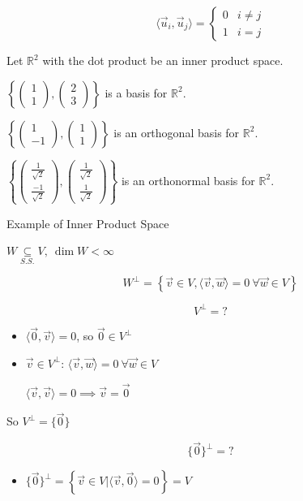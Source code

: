 \documentclass[11pt,fleqn]{book} %
\begin{document}
$$\langle \vec{u}_i, \vec{u}_j \rangle = \begin{cases} 0 &i\neq j \\ 1 &i = j \end{cases}$$

\begin{example}
    Let $\mathbb{R}^2$ with the dot product be an inner product space. 

    $\left\{ \begin{pmatrix} 1 \\ 1 \end{pmatrix}, \begin{pmatrix} 2 \\ 3 \end{pmatrix} \right\}$ is a basis for $\mathbb{R}^2$. 

    $\left\{ \begin{pmatrix} 1 \\ -1 \end{pmatrix}, \begin{pmatrix} 1 \\ 1 \end{pmatrix} \right\}$ is an orthogonal basis for $\mathbb{R}^2$. 

    $\left\{ \begin{pmatrix} \frac{1}{\sqrt{2}} \\ \frac{-1}{\sqrt{2}} \end{pmatrix}, \begin{pmatrix} \frac{1}{\sqrt{2}} \\ \frac{1}{\sqrt{2}} \end{pmatrix} \right\}$ is an orthonormal basis for $\mathbb{R}^2$. 
\end{example}

\begin{example}
    Example of Inner Product Space

    $W \underset{S.S.}{\subseteq}V,~ \dim W < \infty$

    $$W^\perp = \left\{ \vec{v} \in V , \langle \vec{v}, \vec{w} \rangle = 0 ~ \forall \vec{w} \in V \right\}$$

    $$V^\perp = ?$$
    
    \begin{itemize}
        \item $\langle \vec{0}, \vec{v} \rangle = 0$, so $\vec{0} \in V^\perp$

        \item $\vec{v} \in V^\perp$: $\langle \vec{v}, \vec{w} \rangle = 0 ~ \forall \vec{w} \in V$
        
        $\langle \vec{v}, \vec{v} \rangle = 0 \implies \vec{v} = \vec{0}$
    \end{itemize}
    
    So $V^\perp = \{ \vec{0} \}$

    $$\{ \vec{0} \}^\perp = ?$$
    
    \begin{itemize}
        \item $\{ \vec{0} \}^\perp = \left\{ \vec{v} \in V \big| \langle \vec{v}, \vec{0} \rangle = 0 \right\} = V$
    \end{itemize}
\end{example}
\end{document}
